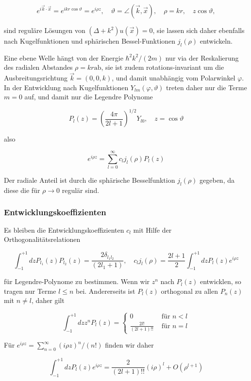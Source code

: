 \documentclass[10pt, letterpaper]{article}
\begin{document}
$$
e^{i \vec{k} \cdot \vec{x}}=e^{i k r \cos \vartheta}=e^{i \rho z}, \quad \vartheta=\angle(\vec{k}, \vec{x}), \quad \rho=k r, \quad z \cos \vartheta,
$$

sind reguläre Lösungen von $\left(\Delta+k^{2}\right) u(\vec{x})=0$, sie lassen sich daher ebenfalls nach Kugelfunktionen und sphärischen Bessel-Funktionen $j_{l}(\rho)$ entwickeln.

Eine ebene Welle hängt von der Energie $\hbar^{2} k^{2} /(2 m)$ nur via der Reskalierung des radialen Abstandes $\rho=k r \mathrm{ab}$, sie ist zudem rotations-invariant um die Ausbreitungsrichtung $\vec{k}=(0,0, k)$, und damit unabhängig vom Polarwinkel $\varphi$. In der Entwicklung nach Kugelfunktionen $Y_{l m}(\varphi, \vartheta)$ treten daher nur die Terme $m=0$ auf, und damit nur die Legendre Polynome

$$
P_{l}(z)=\left(\frac{4 \pi}{2 l+1}\right)^{1 / 2} Y_{l 0}, \quad z=\cos \vartheta
$$

also

$$
e^{i \rho z}=\sum_{l=0}^{\infty} c_{l} j_{l}(\rho) P_{l}(z)
$$

Der radiale Anteil ist durch die sphärische Besselfunktion $j_{l}(\rho)$ gegeben, da diese die für $\rho \rightarrow 0$ regulär sind.

\subsubsection*{Entwicklungskoeffizienten}
Es bleiben die Entwicklungskoeffizienten $c_{l}$ mit Hilfe der Orthogonalitätsrelationen

$$
\int_{-1}^{+1} d z P_{l_{1}}(z) P_{l_{2}}(z)=\frac{2 \delta_{l_{1} l_{2}}}{\left(2 l_{1}+1\right)}, \quad c_{l} j_{l}(\rho)=\frac{2 l+1}{2} \int_{-1}^{+1} d z P_{l}(z) e^{i \rho z}
$$

für Legendre-Polynome zu bestimmen. Wenn wir $z^{n}$ nach $P_{l}(z)$ entwicklen, so tragen nur Terme $l \leq n$ bei. Andererseits ist $P_{l}(z)$ orthogonal zu allen $P_{n}(z)$ mit $n \neq l$, daher gilt

$$
\int_{-1}^{+1} d z z^{n} P_{l}(z)=\left\{\begin{array}{cc}
0 & \text { für } n<l \\
\frac{2 l!}{(2 l+1)!!} & \text { für } n=l
\end{array}\right.
$$

Für $e^{i \rho z}=\sum_{n=0}^{\infty}(i \rho z)^{n} /(n!)$ finden wir daher

$$
\int_{-1}^{+1} d z P_{l}(z) e^{i \rho z}=\frac{2}{(2 l+1)!!}(i \rho)^{l}+O\left(\rho^{l+1}\right)
$$
\end{document}
